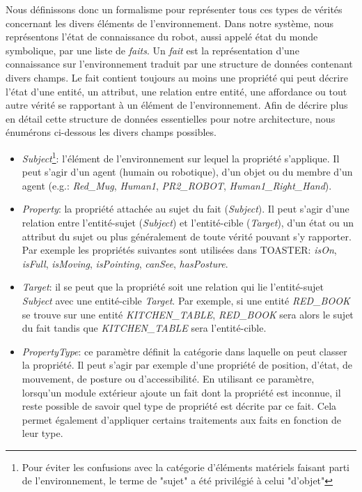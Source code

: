 \documentclass[a4paper,11pt,twoside]{StyleThese}
\begin{document}
Nous définissons donc un formalisme pour représenter tous ces types de vérités concernant les divers éléments de l'environnement.
Dans notre système, nous représentons l'état de connaissance du robot, aussi appelé état du monde symbolique, par une liste de \textit{faits}. Un \textit{fait} est la représentation d'une connaissance sur l'environnement traduit par une structure de données contenant divers champs. Le fait contient toujours au moins une propriété qui peut décrire l'état d'une entité, un attribut, une relation entre entité, une affordance ou tout autre vérité se rapportant à un élément de l'environnement.
Afin de décrire plus en détail cette structure de données essentielles pour notre architecture, nous énumérons ci-dessous les divers champs possibles. 

\begin{itemize}
\item \textit{Subject}\footnote{Pour éviter les confusions avec la catégorie d'éléments matériels faisant parti de l'environnement, le terme de "sujet" a été privilégié à celui "d'objet"}: l'élément de l'environnement sur lequel la propriété s'applique. Il peut s'agir d'un agent (humain ou robotique), d'un objet ou du membre d'un agent (e.g.: \textit{Red\_Mug}, \textit{Human1}, \textit{PR2\_ROBOT}, \textit{Human1\_Right\_Hand}).
\item \textit{Property}: la propriété attachée au sujet du fait (\textit{Subject}). Il peut s'agir d'une relation entre l'entité-sujet (\textit{Subject}) et l'entité-cible (\textit{Target}), d'un état ou un attribut du sujet ou plus généralement de toute vérité pouvant s'y rapporter.  Par exemple les propriétés suivantes sont utilisées dans TOASTER: \textit{isOn}, \textit{isFull}, \textit{isMoving}, \textit{isPointing}, \textit{canSee}, \textit{hasPosture}.
\item \textit{Target}: il se peut que la propriété soit une relation qui lie l'entité-sujet \textit{Subject} avec une entité-cible \textit{Target}. Par exemple, si une entité \textit{RED\_BOOK} se trouve sur une entité \textit{KITCHEN\_TABLE}, \textit{RED\_BOOK} sera alors le sujet du fait tandis que \textit{KITCHEN\_TABLE} sera l'entité-cible.
\item \textit{PropertyType}: ce paramètre définit la catégorie dans laquelle on peut classer la propriété. Il peut s'agir par exemple d'une propriété de position, d'état, de mouvement, de posture ou d'accessibilité. En utilisant ce paramètre, lorsqu'un module extérieur ajoute un fait dont la propriété est inconnue, il reste possible de savoir quel type de propriété est décrite par ce fait. Cela permet également d'appliquer certains traitements aux faits en fonction de leur type.

\end{itemize}
\end{document}
